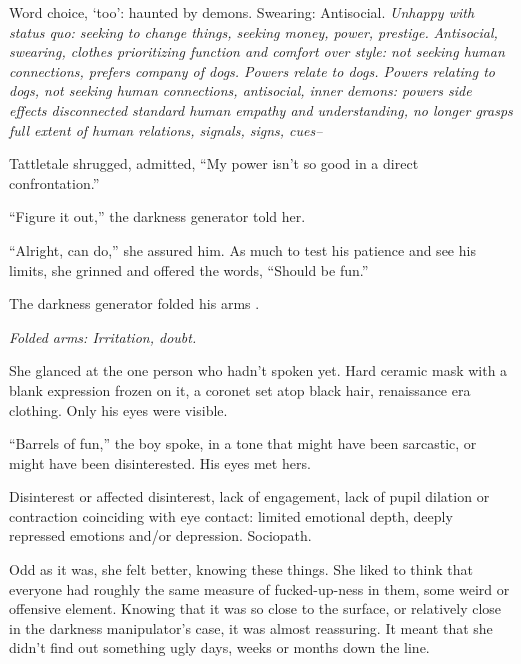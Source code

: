 Word choice, `too':  haunted by demons.
Swearing: Antisocial.\emph{ Unhappy with status quo:  seeking to change things, seeking money, power, prestige.}\emph{ Antisocial, swearing, clothes prioritizing function and comfort over style:  not seeking human connections, prefers company of dogs.  Powers relate to dogs. Powers relating to dogs, not seeking human connections, antisocial, inner demons: powers side effects disconnected standard human empathy and understanding, no longer grasps full extent of human relations, signals, signs, cues--}



Tattletale shrugged, admitted, ``My power isn't so good in a direct confrontation.''



``Figure it out,'' the darkness generator told her.



``Alright, can do,'' she assured him.  As much to test his patience and see his limits, she grinned and offered the words, ``Should be fun.''



The darkness generator folded his arms .



\emph{Folded arms: Irritation, doubt.}



She glanced at the one person who hadn't spoken yet.  Hard ceramic mask with a blank expression frozen on it, a coronet set atop black hair, renaissance era clothing.  Only his eyes were visible.



``Barrels of fun,'' the boy spoke, in a tone that might have been sarcastic, or might have been disinterested.  His eyes met hers.



Disinterest or affected disinterest, lack of engagement, lack of pupil dilation or contraction coinciding with eye contact:  limited emotional depth, deeply repressed emotions and/or depression.  Sociopath.



Odd as it was, she felt better, knowing these things.  She liked to think that everyone had roughly the same measure of fucked-up-ness in them, some weird or offensive element.  Knowing that it was so close to the surface, or relatively close in the darkness manipulator's case, it was almost reassuring.  It meant that she didn't find out something ugly days, weeks or months down the line.




